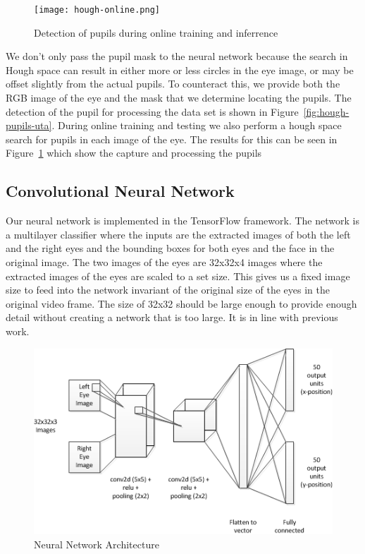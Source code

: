 \documentclass[10pt,twocolumn,letterpaper]{article}
\begin{document}
\begin{figure}[!h]
  \begin{center}
    \texttt{[image: hough-online.png]}
    \caption{Detection of pupils during online training and
      inferrence}
    \label{fig:hough-online}
  \end{center}
\end{figure}

We don't only pass the pupil mask
to the neural network because the search in Hough space can result in
either more or less circles in the eye image, or may be offset
slightly from the actual pupils. To counteract this, we provide both
the RGB image of the eye and the mask that we determine locating the
pupils. The detection of the pupil for processing the data set is shown in
Figure~\ref{fig:hough-pupils-uta}. During online training and testing
we also perform a hough space search for pupils in each image of the
eye. The results for this can be seen in Figure~\ref{fig:hough-online}
which show the capture and processing the pupils 

\subsection{Convolutional Neural Network}
Our neural network is implemented in the TensorFlow framework. The
network is a multilayer classifier where the inputs are the extracted
images of both the left and the right eyes and the bounding boxes for
both eyes and the face in the original image. The two images of the
eyes are 32x32x4 images where the extracted images of the eyes are
scaled to a set size. This gives us a fixed image size to feed into
the network invariant of the original size of the eyes in the original
video frame. The size of 32x32 should be large enough to provide
enough detail without creating a network that is too large. It is in
line with previous work. 

\begin{figure}
  \begin{center}
    \includegraphics[width=\linewidth]{gaze-tracking-cnn-arch}
  \end{center}
  \caption{Neural Network Architecture}
  \label{fig.cnn-arch}
\end{figure}
\end{document}
